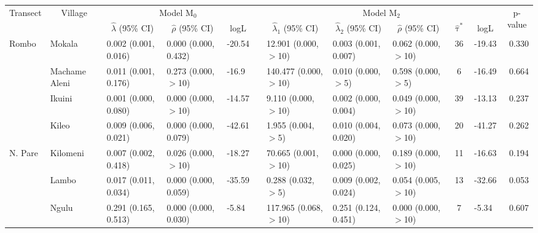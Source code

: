 \begin{tabular}{lllllllllclr}
\toprule
\multicolumn{1}{c}{\multirow{2}{*}{Transect}} & \multicolumn{1}{c}{\multirow{2}{*}{Village}} & \multicolumn{3}{c}{Model M$_0$} & \multicolumn{1}{c}{} & \multicolumn{5}{c}{Model M$_2$} & \multicolumn{1}{c}{\multirow{2}{*}{p-value}}  \\ 
\cmidrule{3-5}\cmidrule{7-11}
\multicolumn{1}{c}{} & \multicolumn{1}{c}{} & \multicolumn{1}{c}{$\hat{\lambda}$ (95\% CI)} & \multicolumn{1}{c}{$\hat{\rho}$ (95\% CI)} & \multicolumn{1}{c}{logL} & \multicolumn{1}{c}{} & \multicolumn{1}{c}{$\hat{\lambda}_1$ (95\% CI)} & \multicolumn{1}{c}{$\hat{\lambda}_2$ (95\% CI)} & \multicolumn{1}{c}{$\hat{\rho}$ (95\% CI)} & \multicolumn{1}{c}{$\hat{\uptau}^*$} & \multicolumn{1}{c}{logL} & \multicolumn{1}{c}{} \\ 
\midrule
Rombo       & Mokala         & 0.002 (0.001, 0.016)   & 0.000 (0.000, 0.432)   & -20.54   & &  12.901  (0.000, $>$10)   & 0.003 (0.001, 0.007)   & 0.062 (0.000, $>$10)   & 36   & -19.43   & 0.330\\
            & Machame Aleni  & 0.011 (0.001, 0.176)   & 0.273 (0.000, $>$10)   & -16.9    & &  140.477 (0.000, $>$10)   & 0.010 (0.000, $>$5)    & 0.598 (0.000, $>$5)    & 6    & -16.49   & 0.664\\
            & Ikuini         & 0.001 (0.000, 0.080)   & 0.000 (0.000, $>$10)   & -14.57   & &  9.110   (0.000, $>$10)   & 0.002 (0.000, 0.004)   & 0.049 (0.000, $>$10)   & 39   & -13.13   & 0.237\\
            & Kileo          & 0.009 (0.006, 0.021)   & 0.000 (0.000, 0.079)   & -42.61   & &  1.955   (0.004, $>$5)    & 0.010 (0.004, 0.020)   & 0.073 (0.000, $>$10)   & 20   & -41.27   & 0.262\\
\cmidrule{2-12}
N. Pare     & Kilomeni       & 0.007 (0.002, 0.418)   & 0.026 (0.000, $>$10)   & -18.27   & &  70.665  (0.001, $>$10)   & 0.000 (0.000, 0.025)   & 0.189 (0.000, $>$10)   & 11   & -16.63   & 0.194\\
            & Lambo          & 0.017 (0.011, 0.034)   & 0.000 (0.000, 0.059)   & -35.59   & &  0.288   (0.032, $>$5)    & 0.009 (0.002, 0.024)   & 0.054 (0.005, $>$10)   & 13   & -32.66   & 0.053\\
            & Ngulu          & 0.291 (0.165, 0.513)   & 0.000 (0.000, 0.030)   & -5.84    & &  117.965 (0.068, $>$10)   & 0.251 (0.124, 0.451)   & 0.000 (0.000, $>$10)   & 7    & -5.34    & 0.607\\

\end{tabular}
